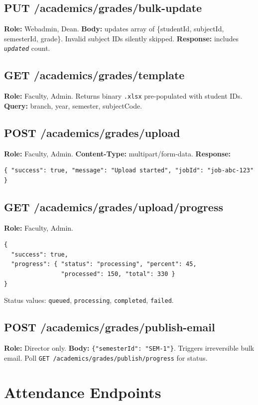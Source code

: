 \documentclass[12pt,a4paper]{report}
\newcommand{\api}[1]{\texttt{\small #1}}
\newcommand{\field}[1]{\texttt{\textit{#1}}}
\newcommand{\code}[1]{\texttt{#1}}
\begin{document}
\subsection{PUT /academics/grades/bulk-update}
\textbf{Role:} Webadmin, Dean. \textbf{Body:} updates array of \{studentId, subjectId, semesterId, grade\}. Invalid subject IDs silently skipped. \textbf{Response:} includes \field{updated} count.

\subsection{GET /academics/grades/template}
\textbf{Role:} Faculty, Admin. Returns binary \code{.xlsx} pre-populated with student IDs. \textbf{Query:} branch, year, semester, subjectCode.

\subsection{POST /academics/grades/upload}
\textbf{Role:} Faculty, Admin. \textbf{Content-Type:} multipart/form-data. \textbf{Response:}
\begin{lstlisting}[caption={Upload initiated},label={lst:uploadstart}]
{ "success": true, "message": "Upload started", "jobId": "job-abc-123" }
\end{lstlisting}

\subsection{GET /academics/grades/upload/progress}
\textbf{Role:} Faculty, Admin.
\begin{lstlisting}[caption={Upload progress},label={lst:progress}]
{
  "success": true,
  "progress": { "status": "processing", "percent": 45,
                "processed": 150, "total": 330 }
}
\end{lstlisting}
Status values: \code{queued}, \code{processing}, \code{completed}, \code{failed}.

\subsection{POST /academics/grades/publish-email}
\textbf{Role:} Director only. \textbf{Body:} \code{\{"semesterId": "SEM-1"\}}. Triggers irreversible bulk email. Poll \api{GET /academics/grades/publish/progress} for status.

\section{Attendance Endpoints}
\end{document}
